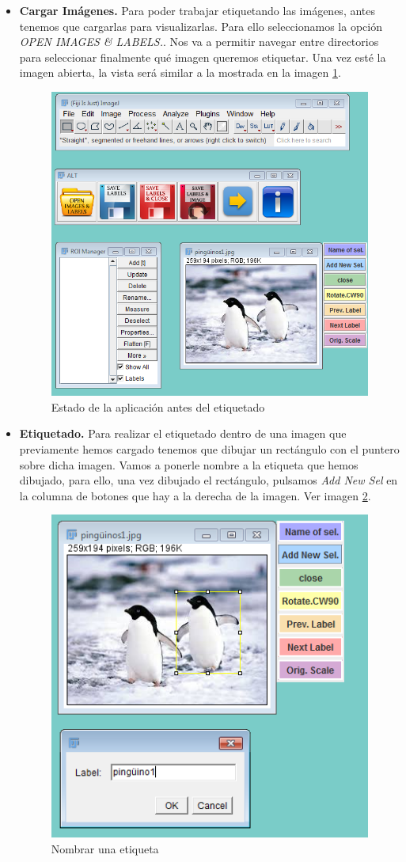 \begin{itemize}
	\item \textbf{Cargar Imágenes.} Para poder trabajar etiquetando las imágenes, antes tenemos que cargarlas para visualizarlas. Para ello seleccionamos la opción \textit{OPEN IMAGES \& LABELS.}. Nos va a permitir navegar entre directorios para seleccionar finalmente qué imagen queremos etiquetar.
	Una vez esté la imagen abierta, la vista será similar a la mostrada en la imagen \ref{fig:etiquetado0}.
	\begin{figure}
		\centering
		\includegraphics[width=0.7\linewidth]{img/etiquetado0}
		\caption{Estado de la aplicación antes del etiquetado}
		\label{fig:etiquetado0}
	\end{figure}
	
	\item \textbf{Etiquetado.} Para realizar el etiquetado dentro de una imagen que previamente hemos cargado tenemos que dibujar un rectángulo con el puntero sobre dicha imagen.
	Vamos a ponerle nombre a la etiqueta que hemos dibujado, para ello, una vez dibujado el rectángulo, pulsamos \textit{Add New Sel} en la columna de botones que hay a la derecha de la imagen. Ver imagen \ref{fig:etiquetapingu}.
	\begin{figure}
		\centering
		\includegraphics[width=0.7\linewidth]{img/etiquetapingu}
		\caption{Nombrar una etiqueta}
		\label{fig:etiquetapingu}
	\end{figure}
	

\end{itemize}
